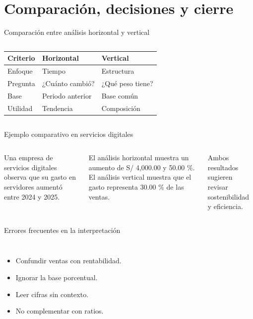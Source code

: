 \section{Comparación, decisiones y cierre}

\begin{frame}{Comparación entre análisis horizontal y vertical}
  \begin{columns}[T,onlytextwidth]
    \scriptsize
    \begin{tabular}{lll}
      \toprule
      Criterio & Horizontal & Vertical \\
      \midrule
      Enfoque & Tiempo & Estructura \\
      Pregunta & ¿Cuánto cambió? & ¿Qué peso tiene? \\
      Base & Periodo anterior & Base común \\
      Utilidad & Tendencia & Composición \\
      \bottomrule
    \end{tabular}
  \end{columns}
\end{frame}

\begin{frame}{Ejemplo comparativo en servicios digitales}
  \begin{columns}[T,onlytextwidth]
    \footnotesize
    Una empresa de servicios digitales observa que su gasto en servidores aumentó entre 2024 y 2025.

    \vspace{0.45em}
    El análisis horizontal muestra un aumento de S/ 4,000.00 y 50.00 \%. El análisis vertical muestra que el gasto representa 30.00 \% de las ventas.

    \vspace{0.45em}
    Ambos resultados sugieren revisar sostenibilidad y eficiencia.
  \end{columns}
\end{frame}

\begin{frame}{Errores frecuentes en la interpretación}
  \begin{columns}[T,onlytextwidth]
    \begin{itemize}
      \item Confundir ventas con rentabilidad.
      \item Ignorar la base porcentual.
      \item Leer cifras sin contexto.
      \item No complementar con ratios.
    \end{itemize}
  \end{columns}
\end{frame}

